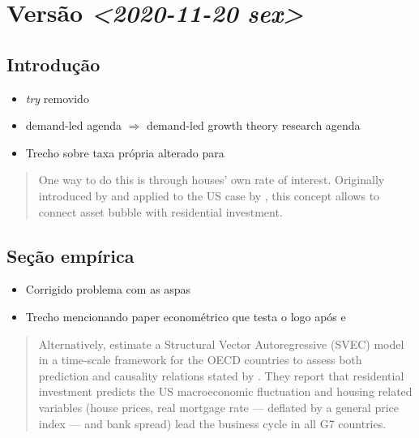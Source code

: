 \documentclass[11pt]{article}
\begin{document}
\section*{Versão \textit{<2020-11-20 sex>}}
\label{sec:orgb7bddb7}

\subsection*{Introdução}
\label{sec:orgd5800e8}

\begin{itemize}
\item \emph{try} removido
\item demand-led agenda \(\Rightarrow\) demand-led growth theory research agenda
\item Trecho sobre taxa própria alterado para
\end{itemize}

\begin{quote}
One way to do this is through houses' own rate of interest.
Originally introduced by \textcite{Sraffa_Own_1932} and applied to the US case by \textcite{teixeira_crescimento_2015}, this concept allows to connect asset bubble with residential investment.
\end{quote}


\subsection*{Seção empírica}
\label{sec:org3233df3}

\begin{itemize}
\item Corrigido problema com as aspas
\item Trecho mencionando paper econométrico que testa o \cite{leamer_housing_2007} logo após \cite{fiebiger_semi-autonomous_2018} e \cite{fiebiger_trend_2017}
\end{itemize}

\begin{quote}
Alternatively, \textcite{huang_is_2020} estimate a Structural Vector Autoregressive (SVEC) model in a time-scale framework for the OECD countries to assess both prediction and causality relations stated by \textcite{leamer_housing_2007}.
They report that residential investment predicts the US  macroeconomic fluctuation and housing related variables (house prices, real mortgage rate --- deflated by a general price index --- and bank spread) lead the business cycle in all G7 countries.
\end{quote}
\end{document}
